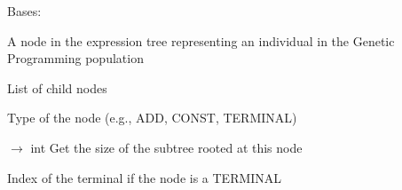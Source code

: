 \documentclass[letterpaper,10pt,english]{sphinxmanual}
\begin{document}
\begin{fulllineitems}
\label{\detokenize{api:scheduler.ExprNode}}
\pysigstartsignatures
\pysigline
{}
\pysigstopsignatures
\sphinxAtStartPar
Bases: 

\sphinxAtStartPar
A node in the expression tree representing an individual in the Genetic Programming population

\begin{fulllineitems}
\label{\detokenize{api:scheduler.ExprNode.children}}
\pysigstartsignatures
\pysigline
{}
\pysigstopsignatures
\sphinxAtStartPar
List of child nodes

\end{fulllineitems}


\begin{fulllineitems}
\label{\detokenize{api:scheduler.ExprNode.nodeType}}
\pysigstartsignatures
\pysigline
{}
\pysigstopsignatures
\sphinxAtStartPar
Type of the node (e.g., ADD, CONST, TERMINAL)

\end{fulllineitems}


\begin{fulllineitems}
\label{\detokenize{api:scheduler.ExprNode.size}}
\pysigstartsignatures
\pysiglinewithargsret
{}
{}
{{ $\rightarrow$ int}}
\pysigstopsignatures
\sphinxAtStartPar
Get the size of the subtree rooted at this node

\end{fulllineitems}


\begin{fulllineitems}
\label{\detokenize{api:scheduler.ExprNode.terminalIndex}}
\pysigstartsignatures
\pysigline
{}
\pysigstopsignatures
\sphinxAtStartPar
Index of the terminal if the node is a TERMINAL

\end{fulllineitems}


\end{fulllineitems}
\end{document}
